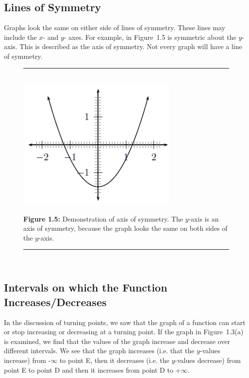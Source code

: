             \subsection{ Lines of Symmetry}
            \nopagebreak
        \label{m39337*id236883}Graphs look the same on either side of lines of symmetry. These lines may include the $x$- and $y$- axes. For example, in Figure~1.5 is symmetric about the $y$-axis. This is described as the axis of symmetry. Not every graph will have a line of symmetry.\par 
    \setcounter{subfigure}{0}
	\begin{figure}[H] %
    \begin{center}
    \rule[.1in]{\figurerulewidth}{.005in} \\
        \label{m39337*uid51!!!underscore!!!media}\label{m39337*uid51!!!underscore!!!printimage}\includegraphics[width=300px]{col11306.imgs/m39337_MG10C11_036.png} %
      \vspace{2pt}
    \vspace{\rubberspace}\par \begin{cnxcaption}
	  \small \textbf{Figure 1.5: }Demonstration of axis of symmetry. The $y$-axis is an axis of symmetry, because the graph looks the same on both sides of the $y$-axis.
	\end{cnxcaption}
    \vspace{.1in}
    \rule[.1in]{\figurerulewidth}{.005in} \\
    \end{center}
 \end{figure}       
      \label{m39337*uid52}
            \subsection{ Intervals on which the Function Increases/Decreases}
            \nopagebreak
        \label{m39337*id236961}In the discussion of turning points, we saw that the graph of a function can start or stop increasing or decreasing at a turning point. If the graph in Figure~1.3(a) is examined, we find that the values of the graph increase and decrease over different intervals. We see that the graph increases (i.e. that the $y$-values increase) from -$\infty $ to point E, then it decreases (i.e. the $y$-values decrease) from point E to point D and then it increases from point D to +$\infty $.\par 
      \label{m39337*uid53}
